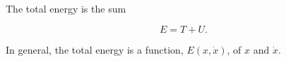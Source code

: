 The total energy is the sum

$$E = T + U.$$

In general, the total energy is a function, $E(x, \dot{x})$, of $x$ and $\dot{x}$.
